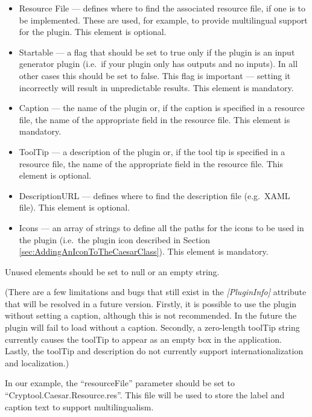 \begin{itemize}
	\item Resource File --- defines where to find the associated resource file, if one is to be implemented. These are used, for example, to provide multilingual support for the plugin. This element is optional.
	\item Startable --- a flag that should be set to true only if the plugin is an input generator plugin (i.e.\ if your plugin only has outputs and no inputs). In all other cases this should be set to false. This flag is important --- setting it incorrectly will result in unpredictable results. This element is mandatory.
	\item Caption --- the name of the plugin or, if the caption is specified in a resource file, the name of the appropriate field in the resource file. This element is mandatory.
	\item ToolTip --- a description of the plugin or, if the tool tip is specified in a resource file, the name of the appropriate field in the resource file. This element is optional.
	\item DescriptionURL --- defines where to find the description file (e.g.\ XAML file). This element is optional.
	\item Icons --- an array of strings to define all the paths for the icons to be used in the plugin (i.e.\ the plugin icon described in Section \ref{sec:AddingAnIconToTheCaesarClass}). This element is mandatory.
\end{itemize}

\noindent Unused elements should be set to null or an empty string.

(There are a few limitations and bugs that still exist in the \textit{[PluginInfo]} attribute that will be resolved in a future version. Firstly, it is possible to use the plugin without setting a caption, although this is not recommended. In the future the plugin will fail to load without a caption. Secondly, a zero-length toolTip string currently causes the toolTip to appear as an empty box in the application. Lastly, the toolTip and description do not currently support internationalization and localization.)

In our example, the ``resourceFile'' parameter should be set to ``Cryptool.Caesar.Resource.res''. This file will be used to store the label and caption text to support multilingualism.


